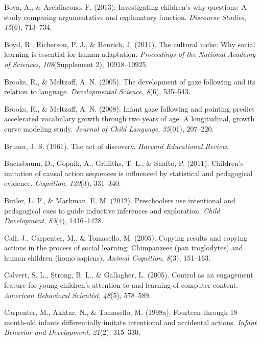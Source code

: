 \documentclass[oneside]{report}
\begin{document}
\leavevmode\hypertarget{ref-bova2013investigating}{}%
Bova, A., \& Arcidiacono, F. (2013). Investigating children's
why-questions: A study comparing argumentative and explanatory function.
\emph{Discourse Studies}, \emph{15}(6), 713--734.

\leavevmode\hypertarget{ref-boyd2011cultural}{}%
Boyd, R., Richerson, P. J., \& Henrich, J. (2011). The cultural niche:
Why social learning is essential for human adaptation. \emph{Proceedings
of the National Academy of Sciences}, \emph{108}(Supplement 2),
10918--10925.

\leavevmode\hypertarget{ref-brooks2005development}{}%
Brooks, R., \& Meltzoff, A. N. (2005). The development of gaze following
and its relation to language. \emph{Developmental Science}, \emph{8}(6),
535--543.

\leavevmode\hypertarget{ref-brooks2008infant}{}%
Brooks, R., \& Meltzoff, A. N. (2008). Infant gaze following and
pointing predict accelerated vocabulary growth through two years of age:
A longitudinal, growth curve modeling study. \emph{Journal of Child
Language}, \emph{35}(01), 207--220.

\leavevmode\hypertarget{ref-bruner1961act}{}%
Bruner, J. S. (1961). The act of discovery. \emph{Harvard Educational
Review}.

\leavevmode\hypertarget{ref-buchsbaum2011children}{}%
Buchsbaum, D., Gopnik, A., Griffiths, T. L., \& Shafto, P. (2011).
Children's imitation of causal action sequences is influenced by
statistical and pedagogical evidence. \emph{Cognition}, \emph{120}(3),
331--340.

\leavevmode\hypertarget{ref-butler2012preschoolers}{}%
Butler, L. P., \& Markman, E. M. (2012). Preschoolers use intentional
and pedagogical cues to guide inductive inferences and exploration.
\emph{Child Development}, \emph{83}(4), 1416--1428.

\leavevmode\hypertarget{ref-call2005copying}{}%
Call, J., Carpenter, M., \& Tomasello, M. (2005). Copying results and
copying actions in the process of social learning: Chimpanzees (pan
troglodytes) and human children (homo sapiens). \emph{Animal Cognition},
\emph{8}(3), 151--163.

\leavevmode\hypertarget{ref-calvert2005control}{}%
Calvert, S. L., Strong, B. L., \& Gallagher, L. (2005). Control as an
engagement feature for young children's attention to and learning of
computer content. \emph{American Behavioral Scientist}, \emph{48}(5),
578--589.

\leavevmode\hypertarget{ref-carpenter1998fourteen}{}%
Carpenter, M., Akhtar, N., \& Tomasello, M. (1998a). Fourteen-through
18-month-old infants differentially imitate intentional and accidental
actions. \emph{Infant Behavior and Development}, \emph{21}(2), 315--330.
\end{document}
